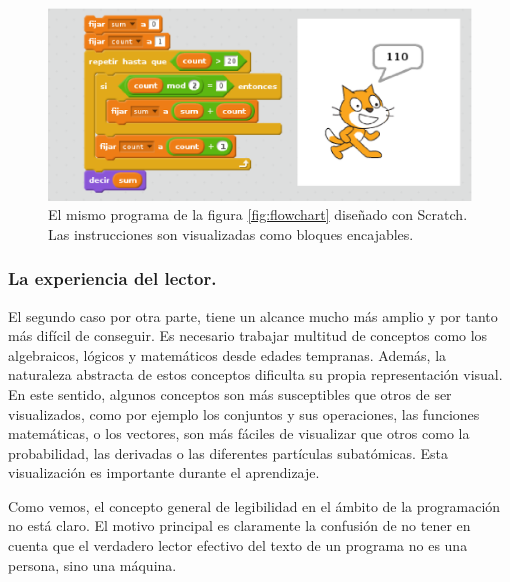 \documentclass{llncs}
\begin{document}
\begin{figure}[ht]
\begin{center}
\includegraphics[scale=0.4]{images/scratch.eps}
\caption{El mismo programa de la figura \ref{fig:flowchart} diseñado con Scratch. Las instrucciones son visualizadas como bloques encajables. 
\label{fig:scratch}}
\end{center}
\end{figure}


\subsubsection{La experiencia del lector.}
\label{subsec:reader}

El segundo caso por otra parte, tiene un alcance mucho más amplio y por tanto más difícil de conseguir. Es necesario trabajar multitud de conceptos como los algebraicos, lógicos y matemáticos desde edades tempranas. Además, la naturaleza abstracta de estos conceptos dificulta su propia representación visual. En este sentido, algunos conceptos son más susceptibles que otros de ser visualizados, como por ejemplo los conjuntos y sus operaciones, las funciones matemáticas, o los vectores, son más fáciles de visualizar que otros como la probabilidad, las derivadas o las diferentes partículas subatómicas. Esta visualización es importante durante el aprendizaje.

Como vemos, el concepto general de legibilidad en el ámbito de la programación no está claro. El motivo principal es claramente la confusión de no tener en cuenta que el verdadero lector efectivo del texto de un programa no es una persona, sino una máquina. 
\end{document}
